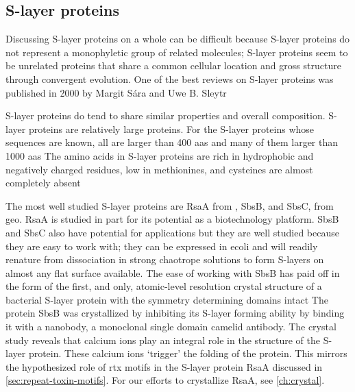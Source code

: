 \subsection{S-layer proteins} \label{sub:intro-slayerproteins} %

Discussing \ac{S-layer} proteins on a whole can be difficult because \ac{S-layer} proteins do not represent a monophyletic group of related molecules; \ac{S-layer} proteins seem to
be unrelated proteins that share a common cellular location and gross structure through convergent evolution. One of the best reviews on \ac{S-layer} proteins was published in 2000
by Margit S\'{a}ra and Uwe B. Sleytr

\ac{S-layer} proteins do tend to share similar properties and overall composition. \ac{S-layer} proteins are relatively large proteins. For the \ac{S-layer} proteins whose
sequences are known, all are larger than 400 \acp{aa} and many of them larger than 1000 \acp{aa} The amino acids in \ac{S-layer} proteins are rich in
hydrophobic and negatively charged residues, low in methionines, and cysteines are almost completely absent

The most well studied \ac{S-layer} proteins are RsaA from \caulobacter{}, SbsB,
and SbsC, from \acl{geo}. RsaA is studied in part for its
potential as a biotechnology platform. SbsB and SbsC also have potential for applications but they are well studied because they are easy to work with; they can be expressed in
\acl{ecoli} and will readily renature from dissociation in strong chaotrope solutions to form \acp{S-layer} on almost any flat surface available. The ease of working with SbsB has
paid off in the form of the first, and only, atomic-level resolution crystal structure of a bacterial \ac{S-layer} protein with the symmetry determining domains
intact The protein SbsB was crystallized by inhibiting its \ac{S-layer} forming ability by binding it with a nanobody, a monoclonal single domain
camelid antibody. The crystal study reveals that calcium ions play an integral role in the structure of the \ac{S-layer} protein. These calcium ions `trigger' the folding of the
protein. This mirrors the hypothesized role of \ac{rtx} motifs in the \caulobacter{} \ac{S-layer} protein RsaA discussed in \cref{sec:repeat-toxin-motifs}. For our efforts to
crystallize RsaA, see \cref{ch:crystal}.
 
